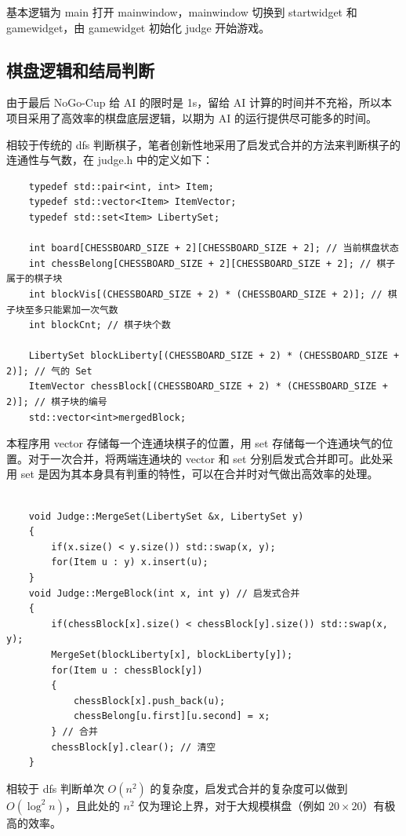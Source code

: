 \documentclass{noithesis}
\begin{document}
	基本逻辑为 main 打开 mainwindow，mainwindow 切换到 startwidget 和 gamewidget，由 gamewidget 初始化 judge 开始游戏。

	\subsection{棋盘逻辑和结局判断}
	
	由于最后 NoGo-Cup 给 AI 的限时是 1s，留给 AI 计算的时间并不充裕，所以本项目采用了高效率的棋盘底层逻辑，以期为 AI 的运行提供尽可能多的时间。
	
	相较于传统的 dfs 判断棋子，笔者创新性地采用了启发式合并的方法来判断棋子的连通性与气数，在 judge.h 中的定义如下：
	
	\begin{lstlisting}
	typedef std::pair<int, int> Item;
	typedef std::vector<Item> ItemVector;
	typedef std::set<Item> LibertySet;
	
	int board[CHESSBOARD_SIZE + 2][CHESSBOARD_SIZE + 2]; // 当前棋盘状态
	int chessBelong[CHESSBOARD_SIZE + 2][CHESSBOARD_SIZE + 2]; // 棋子属于的棋子块
	int blockVis[(CHESSBOARD_SIZE + 2) * (CHESSBOARD_SIZE + 2)]; // 棋子块至多只能累加一次气数
	int blockCnt; // 棋子块个数
	
	LibertySet blockLiberty[(CHESSBOARD_SIZE + 2) * (CHESSBOARD_SIZE + 2)]; // 气的 Set
	ItemVector chessBlock[(CHESSBOARD_SIZE + 2) * (CHESSBOARD_SIZE + 2)]; // 棋子块的编号
	std::vector<int>mergedBlock;
	\end{lstlisting}

	本程序用 vector 存储每一个连通块棋子的位置，用 set 存储每一个连通块气的位置。对于一次合并，将两端连通块的 vector 和 set 分别启发式合并即可。此处采用 set 是因为其本身具有判重的特性，可以在合并时对气做出高效率的处理。
	
	\begin{lstlisting}
		
	void Judge::MergeSet(LibertySet &x, LibertySet y)
	{
		if(x.size() < y.size()) std::swap(x, y);
		for(Item u : y) x.insert(u);
	}
	void Judge::MergeBlock(int x, int y) // 启发式合并
	{
		if(chessBlock[x].size() < chessBlock[y].size()) std::swap(x, y);
		MergeSet(blockLiberty[x], blockLiberty[y]);
		for(Item u : chessBlock[y])
		{
			chessBlock[x].push_back(u);
			chessBelong[u.first][u.second] = x;
		} // 合并
		chessBlock[y].clear(); // 清空
	}
	\end{lstlisting}

	相较于 dfs 判断单次 $O\left(n^2\right)$ 的复杂度，启发式合并的复杂度可以做到 $O\left(\log^2 n\right)$，且此处的 $n^2$ 仅为理论上界，对于大规模棋盘（例如 $20\times 20$）有极高的效率。
	
\end{document}
